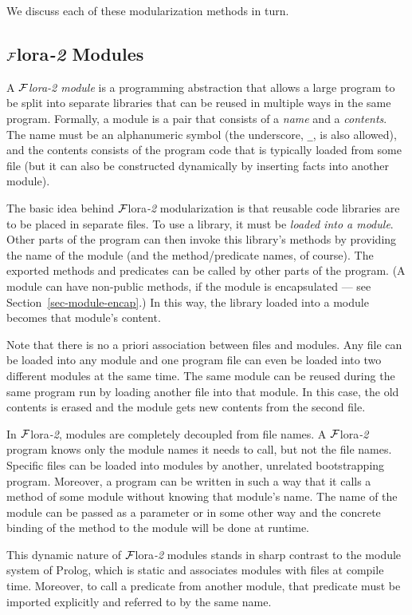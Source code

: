 \documentclass[11pt]{article}
\newcommand{\FLORA}{{\mbox{\sc ${\cal F}${lora}\rm\emph{-2}}}\xspace}
\begin{document}
We discuss each of these modularization methods in turn.


\subsection{\FLORA Modules} \label{sec:flora-modules}

A \emph{\FLORA module} is a programming abstraction that allows a large
program to be split into separate libraries that can be reused in multiple
ways in the same program. Formally, a module is a pair that consists of a
\emph{name} and a \emph{contents}. The name must be an alphanumeric symbol
(the underscore, {\tt \_}, is also allowed), and the contents consists of
the program code that is typically loaded from some file (but it can also
be constructed dynamically by inserting facts
into another module).

The basic idea behind \FLORA modularization is that reusable code libraries
are to be placed in separate files.  To use a library, it must be
\emph{loaded into a module}. Other parts of the program can then invoke
this library's methods by providing the name of the module (and the
method/predicate names, of course).  
The exported methods and predicates can be called by other
parts of the program. (A module can have non-public methods, if the module
is encapsulated ---
see Section~\ref{sec-module-encap}.)
In this way, the library loaded into a module becomes that module's content.

Note that there is no a priori association between files and modules.  Any
file can be loaded into any module and one program file can even be loaded
into two different modules at the same time. The same module can be reused
during the same program run by loading another file into that module. In
this case, the old contents is erased and the module gets new contents from
the second file.

In \FLORA, modules are completely decoupled from file names. A \FLORA
program knows only the module names it needs to call, but not the file
names. Specific files can be loaded into modules by another, unrelated
bootstrapping program. Moreover, a program can be written in such a way
that it calls a method of some module without knowing that module's name.
The name of the module can be passed as a parameter or in some other way
and the concrete binding of the method to the module will be done at
runtime.

This dynamic nature of \FLORA modules stands in sharp contrast to the module
system of Prolog, which is static and associates modules with files at compile
time. Moreover, to call a predicate from another module, that predicate
must be imported explicitly and referred to by the same name.
\end{document}
